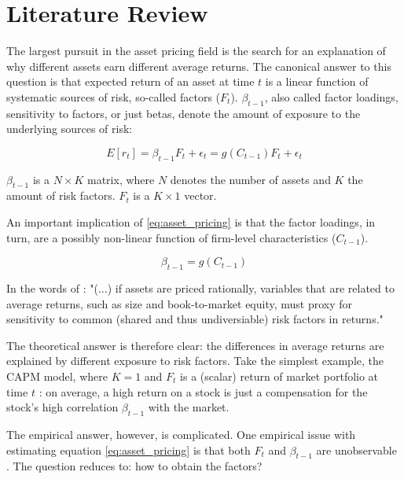 \chapter{Literature Review}
\label{chap:lit} 
	
 	The largest pursuit in the asset pricing field is the search for an explanation of why different assets earn different average returns. The canonical answer to this question is that expected return of an asset at time $t$ is a linear function of systematic sources of risk, so-called factors ($F_t$). $\beta_{t-1}$, also called factor loadings, sensitivity to factors, or just betas, denote the amount of exposure to the underlying sources of risk: 
		
		\begin{equation}
			E[r_t] = \beta_{t-1}F_t + \epsilon_t  = g(C_{t-1})F_t + \epsilon_t \label{eq:asset_pricing}
		\end{equation}
	
	
	$\beta_{t-1}$ is a $N \times K$ matrix, where $N$ denotes the number of assets and $K$ the amount of risk factors. $F_t$ is a $K \times1 $ vector.
	
	An important implication of \ref{eq:asset_pricing} is that the factor loadings, in turn, are a possibly non-linear function of firm-level characteristics ($C_{t-1}$). 
		
		\begin{equation}
			\beta_{t-1}= g(C_{t-1})\label{eq:characteristics_as_proxies}
		\end{equation}
	
	In the words of \cite{fama1993common}: "(...) if assets are priced rationally, variables that are
	related to average returns, such as size and book-to-market equity, must proxy for
	sensitivity to common (shared and thus undiversiable) risk factors in returns." 	
	
	The theoretical answer is therefore clear: the differences in average returns are explained by different exposure to risk factors. 
	Take the simplest example, the CAPM model, where $K=1$ and $F_t$ is a (scalar) return of market portfolio at time $t$ \citep{cochrane2009asset}: on average, a high return on a stock is just a compensation for the stock's high correlation $\beta_{t-1}$ with the market. 
	
	The empirical answer, however, is complicated. One empirical issue with estimating equation \ref{eq:asset_pricing} is that both $F_t$ and $\beta_{t-1}$ are unobservable \citep{kelly2019characteristics}. The question reduces to: how to obtain the factors? 
	
